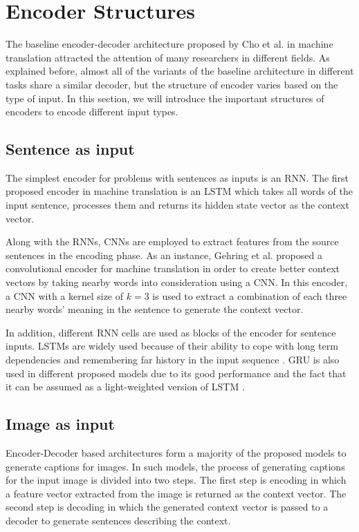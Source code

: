 \documentclass[preprint, 12pt]{elsarticle}
\begin{document}
		
	\section{Encoder Structures}
	The baseline encoder-decoder architecture proposed by Cho et al. \cite{cho2014learning} in machine translation attracted the attention of many researchers in different fields. As explained before, almost all of the variants of the baseline architecture in different tasks share a similar decoder, but the structure of encoder varies based on the type of input. In this section, we will introduce the important structures of encoders to encode different input types.
		\subsection{Sentence as input}
		The simplest encoder for problems with sentences as inputs is an RNN. The first proposed encoder in machine translation is an LSTM which takes all words of the input sentence, processes them and returns its hidden state vector as the context vector. 
		
		Along with the RNNs, CNNs are employed to extract features from the source sentences in the encoding phase. As an instance, Gehring et al. proposed a convolutional encoder for machine translation in order to create better context vectors by taking nearby words into consideration using a CNN\cite{gehring2016convolutional}. In this encoder, a CNN with a kernel size of $k = 3$ is used to extract a combination of each three nearby words' meaning in the sentence to generate the context vector. 
		
		In addition, different RNN cells are used as blocks of the encoder for sentence inputs. LSTMs\cite{hochreiter1997long} are widely used because of their ability to cope with long term dependencies and remembering far history in the input sequence \cite{sutskever2014sequence}\cite{bahdanau2014neural}\cite{luong2015stanford}\cite{xu2015show}. GRU \cite{cho2014learning} is also used in different proposed models due to its good performance and the fact that it can be assumed as a light-weighted version of LSTM \cite{cho2014learning}\cite{mi2016coverage}\cite{he2016dual}\cite{tu2017context}.
		\subsection{Image as input}
		Encoder-Decoder based architectures form a majority of the proposed models to generate captions for images. In such models, the process of generating captions for the input image is divided into two steps. The first step is encoding in which a feature vector extracted from the image is returned as the context vector. The second step is decoding in which the generated context vector is passed to a decoder to generate sentences describing the context. 
		
\end{document}
